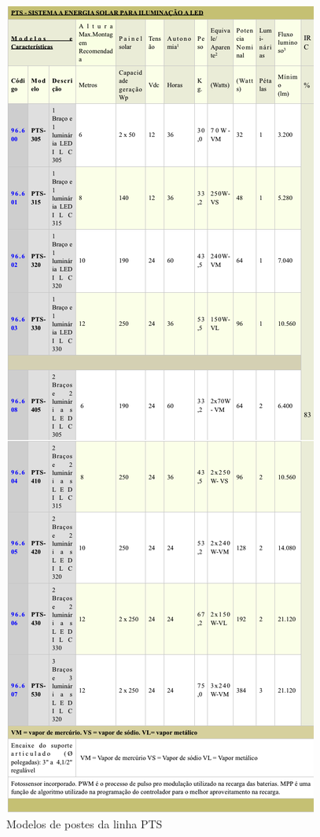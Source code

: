 \begin{figure}[H]
	 \centering
	\label{TabelaModelosPoste}
	 \includegraphics[keepaspectratio=true,scale=0.2]{figuras/TabelaModelosPoste.png}
	 \caption{Modelos de postes da linha PTS}
\end{figure}

